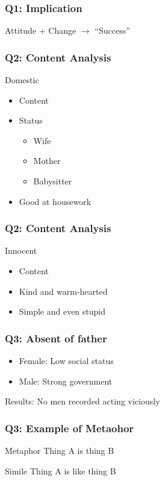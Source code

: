 \documentclass{beamer}
\begin{document}
\begin{frame}
    \frametitle{Q1: Implication}
    \huge{Attitude + Change $\rightarrow$ ``Success''}
\end{frame}

\begin{frame}
    \frametitle{Q2: Content Analysis}
    \begin{block}{Domestic}
        \begin{itemize}
            \item Content
            \item Status
                  \begin{itemize}
                      \item Wife
                      \item Mother
                      \item Babysitter
                  \end{itemize}
            \item Good at housework
        \end{itemize}
    \end{block}
\end{frame}

\begin{frame}
    \frametitle{Q2: Content Analysis}
    \begin{block}{Innocent}
        \begin{itemize}
            \item Content
            \item Kind and warm-hearted
            \item Simple and even stupid
        \end{itemize}
    \end{block}
\end{frame}

\begin{frame}
    \frametitle{Q3: Absent of father}
    \begin{itemize}
        \item Female: Low social status
        \item Male: Strong government
    \end{itemize}
    \huge{\alert{Results: No men recorded acting viciously}}
\end{frame}

\begin{frame}
    \frametitle{Q3: Example of Metaohor}
    \begin{block}{Metaphor}
        Thing A is thing B
    \end{block}


    \begin{block}{Simile}
        Thing A is like thing B
    \end{block}
\end{frame}
\end{document}
